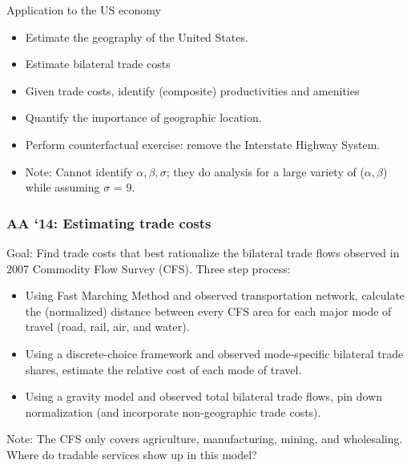 \documentclass[10pt,notes=hide]{beamer}
\begin{document}
\begin{frame}{Application to the US economy}
\begin{itemize}
\item Estimate the geography of the United States.
\item Estimate bilateral trade costs
\item Given trade costs, identify (composite) productivities and amenities 
\item Quantify the importance of geographic location.
\item Perform counterfactual exercise: remove the Interstate Highway System. 
\item Note: Cannot identify $\alpha, \beta, \sigma$; they do analysis for a large variety of ($\alpha, \beta$) while assuming $\sigma$ = 9.
\end{itemize}
\end{frame}
\begin{frame}
\frametitle{AA `14: Estimating trade costs}
Goal: Find trade costs that best rationalize the bilateral trade flows observed in 2007 Commodity Flow Survey (CFS).
Three step process:
\begin{itemize}
\item Using Fast Marching Method and observed transportation network, calculate the (normalized) distance between every CFS area for each major mode of travel (road, rail, air, and water).
\item Using a discrete-choice framework and observed mode-specific bilateral trade shares, estimate the relative cost of each mode of travel.
\item Using a gravity model and observed total bilateral trade flows, pin down normalization (and incorporate non-geographic trade costs).
\end{itemize}
Note: The CFS only covers agriculture, manufacturing, mining, and wholesaling. Where do tradable services show up in this model?
\end{frame}
\end{document}
